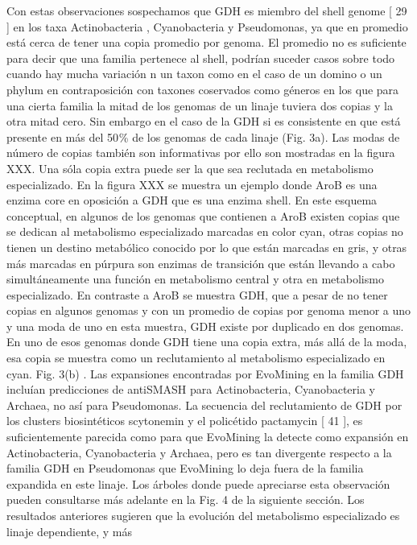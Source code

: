 \documentclass[12pt,twoside]{reedthesis}
\begin{document}
  Con estas observaciones sospechamos que GDH es miembro del shell genome
  {[} 29 {]} en los taxa Actinobacteria , Cyanobacteria y Pseudomonas, ya
  que en promedio está cerca de tener una copia promedio por genoma. El
  promedio no es suficiente para decir que una familia pertenece al shell,
  podrían suceder casos sobre todo cuando hay mucha variación n un taxon
  como en el caso de un domino o un phylum en contraposición con taxones
  coservados como géneros en los que para una cierta familia la mitad de
  los genomas de un linaje tuviera dos copias y la otra mitad cero. Sin
  embargo en el caso de la GDH si es consistente en que está presente en
  más del 50 \% de los genomas de cada linaje (Fig. 3a). Las modas de
  número de copias también son informativas por ello son mostradas en la
  figura XXX. Una sóla copia extra puede ser la que sea reclutada en
  metabolismo especializado. En la figura XXX se muestra un ejemplo donde
  AroB es una enzima core en oposición a GDH que es una enzima shell. En
  este esquema conceptual, en algunos de los genomas que contienen a AroB
  existen copias que se dedican al metabolismo especializado marcadas en
  color cyan, otras copias no tienen un destino metabólico conocido por lo
  que están marcadas en gris, y otras más marcadas en púrpura son enzimas
  de transición que están llevando a cabo simultáneamente una función en
  metabolismo central y otra en metabolismo especializado. En contraste a
  AroB se muestra GDH, que a pesar de no tener copias en algunos genomas y
  con un promedio de copias por genoma menor a uno y una moda de uno en
  esta muestra, GDH existe por duplicado en dos genomas. En uno de esos
  genomas donde GDH tiene una copia extra, más allá de la moda, esa copia
  se muestra como un reclutamiento al metabolismo especializado en cyan.
  Fig. 3(b) . Las expansiones encontradas por EvoMining en la familia GDH
  incluían predicciones de antiSMASH para Actinobacteria, Cyanobacteria y
  Archaea, no así para Pseudomonas. La secuencia del reclutamiento de GDH
  por los clusters biosintéticos scytonemin y el policétido pactamycin {[}
  41 {]}, es suficientemente parecida como para que EvoMining la detecte
  como expansión en Actinobacteria, Cyanobacteria y Archaea, pero es tan
  divergente respecto a la familia GDH en Pseudomonas que EvoMining lo
  deja fuera de la familia expandida en este linaje. Los árboles donde
  puede apreciarse esta observación pueden consultarse más adelante en la
  Fig. 4 de la siguiente sección. Los resultados anteriores sugieren que
  la evolución del metabolismo especializado es linaje dependiente, y más
\end{document}
